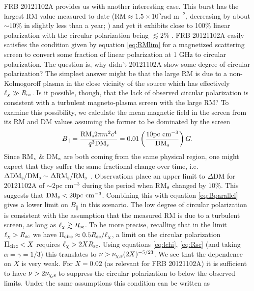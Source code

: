 \documentclass[fleqn,usenatbib]{mnras}
\begin{document}
	FRB 20121102A provides us with another interesting case. This burst has the largest RM value measured to date ($\mbox{RM}\approx 1.5\times 10^5\mbox{rad m}^{-2}$, decreasing by about $\sim 10\%$ in slightly less than a year; \citealt{Michilli+18}) and yet it exhibits close to 100\% linear polarization with the circular polarization being $\lesssim 2\%$ \citep{Michilli+18}. FRB 20121102A easily satisfies the condition given by equation \ref{eq:RMlim} for a magnetized scattering screen to convert some fraction of linear polarization at 1 GHz to circular polarization. The question is, why didn't 20121102A show some degree of circular polarization? The simplest answer might be that the large RM is due to a non-Kolmogoroff plasma in the close vicinity of the source which has effectively $\ell_\chi\gg R_{\rm sc}$. Is it possible, though, that the lack of observed circular polarization is consistent with a turbulent magneto-plasma screen with the large RM? To examine this possibility, we calculate the mean magnetic field in the screen from its RM and DM values assuming the former to be dominated by the screen
	\begin{equation}
		\label{eq:Bparallel}
		B_{\parallel}=\frac{\mbox{RM}_{\rm s}2\pi m^2 c^4}{q^3 \mbox{DM}_{\rm s}}=0.01 \left(\frac{10\mbox{pc cm}^{-3}}{\mbox{DM}_{\rm s}}\right) G. 
	\end{equation}
	Since RM$_{\rm s}$ \& DM$_{\rm s}$ are both coming from the same physical region, one might expect that they suffer the same fractional change over time, i.e. $\Delta \mbox{DM}_{\rm s}/\mbox{DM}_{\rm s}\sim \Delta \mbox{RM}_{\rm s}/\mbox{RM}_{\rm s}$ \citep{Katz2021}. Observations place an upper limit to $\Delta$DM for 20121102A of $\sim 2\mbox{pc cm}^{-3}$ during the period when RM$_{\rm s}$ changed by $10\%$. This suggests that $\mbox{DM}_{\rm s}<20\mbox{pc cm}^{-3}$. Combining this with equation \ref{eq:Bparallel} gives a lower limit on $B_{\parallel}$ in this scenario. The low degree of circular polarization is consistent with the assumption that the measured RM is due to a turbulent screen, as long as $\ell_{\chi}\gtrsim R_{\rm sc}$. To be more precise, recalling that in the limit $\ell_{\chi}>R_{\rm sc}$ we have $\Pi_{\rm circ}\approx 0.5 R_{\rm sc}/\ell_{\chi}$, a limit on the circular polarization $\Pi_{\rm circ}<X$ requires $\ell_{\chi}>2XR_{\rm sc}$. Using equations \ref{eq:lchi}, \ref{eq:Rsc} (and taking $\alpha=\gamma=1/3$) this translates to $\nu>\nu_{\chi,\rm s}(2X)^{-5/23}$. We see that the dependence on $X$ is very weak. For $X=0.02$ (as relevant for FRB 20121102A) it is sufficient to have $\nu>2\nu_{\chi,\rm s}$ to suppress the circular polarization to below the observed limits. Under the same assumptions this condition can be written as
\end{document}

